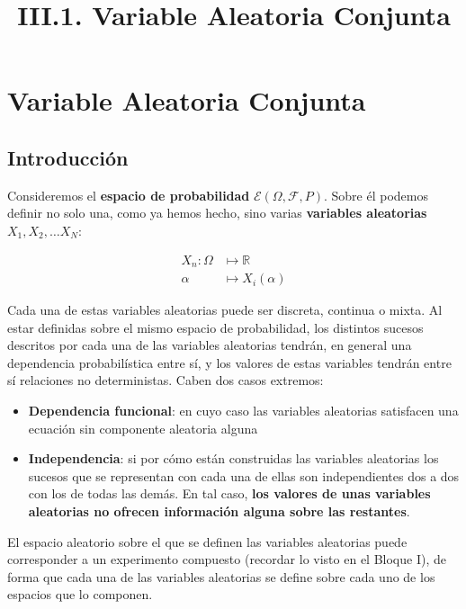 \documentclass[11pt]{article}
\title{III.1. Variable Aleatoria Conjunta}
\providecommand{\tightlist}{%
      \setlength{\itemsep}{0pt}\setlength{\parskip}{0pt}}
\begin{document}
    
    
    \maketitle
    
    

    
    \hypertarget{iii.1-variable-aleatoria-conjunta}{%
\section{Variable Aleatoria
Conjunta}\label{iii.1-variable-aleatoria-conjunta}}

\hypertarget{introducciuxf3n}{%
\subsection{Introducción}\label{introducciuxf3n}}

Consideremos el \textbf{espacio de probabilidad}
\(\mathscr{E}(\Omega, \mathscr{F}, P)\). Sobre él podemos definir no
solo una, como ya hemos hecho, sino varias \textbf{variables aleatorias}
\(X_1, X_2, \ldots X_N\):

\begin{align*}
X_n:  \mathscr{\Omega} & \longmapsto \mathbb{R}\\
   \alpha & \longmapsto X_i(\alpha)
   \end{align*}


Cada una de estas variables aleatorias puede ser discreta, continua o
mixta. Al estar definidas sobre el mismo espacio de probabilidad, los
distintos sucesos descritos por cada una de las variables aleatorias
tendrán, en general una dependencia probabilística entre sí, y los
valores de estas variables tendrán entre sí relaciones no deterministas.
Caben dos casos extremos:

\begin{itemize}
\tightlist
\item
  \textbf{Dependencia funcional}: en cuyo caso las variables aleatorias
  satisfacen una ecuación sin componente aleatoria alguna
\item
  \textbf{Independencia}: si por cómo están construidas las variables
  aleatorias los sucesos que se representan con cada una de ellas son
  independientes dos a dos con los de todas las demás. En tal caso,
  \textbf{los valores de unas variables aleatorias no ofrecen
  información alguna sobre las restantes}.
\end{itemize}

    El espacio aleatorio sobre el que se definen las variables aleatorias
puede corresponder a un experimento compuesto (recordar lo visto en el
Bloque I), de forma que cada una de las variables aleatorias se define
sobre cada uno de los espacios que lo componen.
\end{document}
